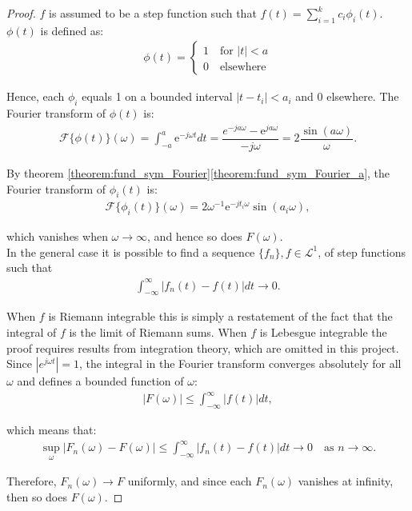 \begin{proof}
$f$ is assumed to be a step function such that $f(t) = \sum_{i=1}^k c_i \phi_i(t)$. $\phi(t)$ is defined as:
\begin{align*}
\phi(t) =
	\begin{cases}
		1 \quad \text{for } |t| < a \\
		0 \quad \text{elsewhere}
	\end{cases}
\end{align*}

Hence, each $\phi_i$ equals 1 on a bounded interval $|t - t_i| < a_i$ and 0 elsewhere. The Fourier transform of $\phi(t)$ is:
\begin{align*}
\mathcal{F}\{\phi(t)\}(\omega) = \int_{-a}^a \text{e}^{-j\omega t} dt = \dfrac{e^{-ja\omega} - \text{e}^{ja\omega}}{-j\omega} = 2\dfrac{\sin(a\omega)}{\omega}.
\end{align*}

By theorem \ref{theorem:fund_sym_Fourier}\ref{theorem:fund_sym_Fourier_a}, the Fourier transform of $\phi_i(t)$ is:
\begin{align*}
\mathcal{F}\{\phi_i(t)\}(\omega) = 2 \omega^{-1} \text{e}^{-jt_i\omega} \sin(a_i\omega),
\end{align*}

which vanishes when $\omega \to \infty$, and hence so does $F(\omega)$.
\\
In the general case it is possible to find a sequence $\{f_n\}, f \in \mathcal{L}^1$, of step functions such that
\begin{align*}
\int_{-\infty}^\infty |f_n(t) - f(t)| dt \to 0.
\end{align*}

When $f$ is Riemann integrable this is simply a restatement of the fact that the integral of $f$ is the limit of Riemann sums. When $f$ is Lebesgue integrable the proof requires results from integration theory, which are omitted in this project. Since $|e^{j\omega t}| = 1$, the integral in the Fourier transform converges absolutely for all $\omega$ and defines a bounded function of $\omega$:
\begin{align*}
|F(\omega)| \leq \int_{-\infty}^\infty |f(t)| dt,
\end{align*}

which means that:
\begin{align*}
\sup_{\omega} |F_n(\omega) - F(\omega)| \leq \int_{-\infty}^\infty |f_n(t) - f(t)| dt \to 0 \quad \text{as } n \to \infty.
\end{align*}

Therefore, $F_n(\omega) \to F$ uniformly, and since each $F_n(\omega)$ vanishes at infinity, then so does $F(\omega)$.
\end{proof}


